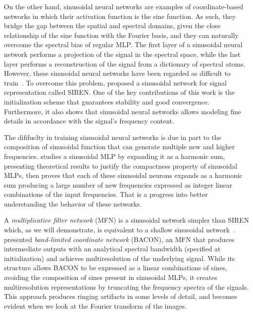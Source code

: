 On the other hand, sinusoidal neural networks are examples of coordinate-based networks in which their activation function is the sine function. As such, they bridge the gap between the spatial and spectral domains, given the close relationship of the sine function with the Fourier basis, and they can naturally overcome the spectral bias of regular MLP. The first layer of a sinusoidal neural network performs a projection of the signal in the spectral space, while the last layer performs a reconstruction of the signal from a dictionary of spectral atoms. However, these sinusoidal neural networks have been regarded as difficult to train~\cite{taming2017}. To overcome this problem, \citet{sitzmann2019siren} proposed a sinusoidal network for signal representation called SIREN. One of the key contributions of this work is the initialization scheme that guarantees stability and good convergence. Furthermore, it also shows that sinusoidal neural networks allows modeling fine details in accordance with the signal’s frequency content. 

The dififuclty in training sinusoidal neural networks is due in part to the composition of sinusoidal function that can generate multiple new and higher frequencies. \cite{novello2022understanding} studies a sinusoidal MLP by expanding it as a harmonic sum, presenting theoretical results to justify the compactness property of sinusoidal MLPs, then proves that each of these sinusoidal neurons expands as a harmonic sum producing a large number of new frequencies expressed as integer linear combinations of the input frequencies. That is a progress into better understanding the behavior of these networks.

A \textit{multiplicative filter network} (MFN) is a sinusoidal network simpler than SIREN which, as we will demonstrate, is equivalent to a shallow sinusoidal network~\cite{fathony2020multiplicative}. \citet{bacon2021} presented \textit{band-limited coordinate network }(BACON), an MFN that produces intermediate outputs with an analytical spectral bandwidth (specified at initialization) and achieves multiresolution of the underlying signal. While its structure allows BACON to be expressed as a linear combinations of sines, avoiding the composition of sines present in sinusoidal MLPs, it creates multiresolution representations by truncating the frequency spectra of the signals. This approach produces ringing artifacts  in some levels of detail, and becomes evident when we look at the Fourier transform of the images.

